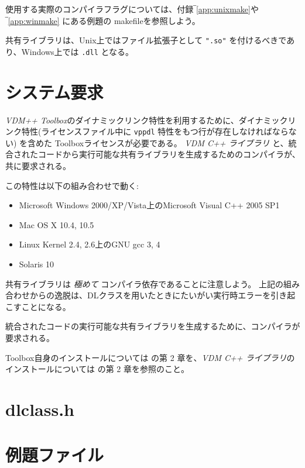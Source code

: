 \documentclass[\pformat,12pt]{jarticle}
\begin{document}
使用する実際のコンパイラフラグについては、付録‾\ref{app:unixmake}や‾\ref{app:winmake} にある例題の makefileを参照しよう。

共有ライブラリは、Unix上ではファイル拡張子として {\tt ".so"} を付けるべきであり、Windows上では \texttt{.dll} となる。 

\newpage


\newpage
\appendix

\section{システム要求}
\label{sec:sysreq}

 {\it VDM++ Toolbox}のダイナミックリンク特性を利用するために、ダイナミックリンク特性(ライセンスファイル中に {\tt vppdl} 特性をもつ行が存在しなければならない) 
を含めた Toolboxライセンスが必要である。
 {\it VDM  C++ ライブラリ} と、統合されたコードから実行可能な共有ライブラリを生成するためのコンパイラが、共に要求される。

この特性は以下の組み合わせで動く:
\begin{itemize}
\item Microsoft Windows 2000/XP/Vista上のMicrosoft Visual C++ 2005 SP1
\item Mac OS X 10.4, 10.5
\item Linux Kernel 2.4, 2.6上のGNU gcc 3, 4
\item Solaris 10
\end{itemize}

共有ライブラリは \textit{極めて} コンパイラ依存であることに注意しよう。
上記の組み合わせからの逸脱は、DLクラスを用いたときにたいがい実行時エラーを引き起こすことになる。

統合されたコードの実行可能な共有ライブラリを生成するために、コンパイラが要求される。
 
Toolbox自身のインストールについては \cite{UserManPP-CSK}の第 2 章を、{\it VDM C++ ライブラリ}のインストールについては \cite{CGManPP-CSK}の第 2 章を参照のこと。

\newpage
\section{dlclass.h}\label{app:dlclass_h}



\newpage
\section{例題ファイル}\label{app:interfacelayer}
\end{document}
